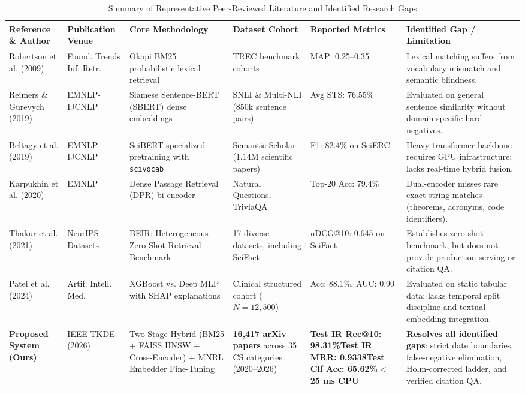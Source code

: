 \documentclass[journal]{IEEEtran}
\begin{document}
\begin{table}[t]
\caption{Summary of Representative Peer-Reviewed Literature and Identified Research Gaps}
\label{tab:literature}
\centering
\small
\begin{tabular}{p{2.6cm}p{2.2cm}p{3.2cm}p{2.5cm}p{2.2cm}p{3.5cm}}
\toprule
\textbf{Reference \& Author} & \textbf{Publication Venue} & \textbf{Core Methodology} & \textbf{Dataset Cohort} & \textbf{Reported Metrics} & \textbf{Identified Gap / Limitation} \\
\midrule
Robertson et al. (2009) \cite{robertson2009probabilistic} & Found. Trends Inf. Retr. & Okapi BM25 probabilistic lexical retrieval & TREC benchmark cohorts & MAP: 0.25--0.35 & Lexical matching suffers from vocabulary mismatch and semantic blindness. \\
Reimers \& Gurevych (2019) \cite{reimers2019sentence} & EMNLP-IJCNLP & Siamese Sentence-BERT (SBERT) dense embeddings & SNLI \& Multi-NLI (850k sentence pairs) & Avg STS: 76.55\% & Evaluated on general sentence similarity without domain-specific hard negatives. \\
Beltagy et al. (2019) \cite{beltagy2019scibert} & EMNLP-IJCNLP & SciBERT specialized pretraining with \texttt{scivocab} & Semantic Scholar (1.14M scientific papers) & F1: 82.4\% on SciERC & Heavy transformer backbone requires GPU infrastructure; lacks real-time hybrid fusion. \\
Karpukhin et al. (2020) \cite{karpukhin2020dense} & EMNLP & Dense Passage Retrieval (DPR) bi-encoder & Natural Questions, TriviaQA & Top-20 Acc: 79.4\% & Dual-encoder misses rare exact string matches (theorems, acronyms, code identifiers). \\
Thakur et al. (2021) \cite{thakur2021beir} & NeurIPS Datasets & BEIR: Heterogeneous Zero-Shot Retrieval Benchmark & 17 diverse datasets, including SciFact & nDCG@10: 0.645 on SciFact & Establishes zero-shot benchmark, but does not provide production serving or citation QA. \\
Patel et al. (2024) \cite{patel2024interpretability} & Artif. Intell. Med. & XGBoost vs. Deep MLP with SHAP explanations & Clinical structured cohort ($N=12,500$) & Acc: 88.1\%, AUC: 0.90 & Evaluated on static tabular data; lacks temporal split discipline and textual embedding integration. \\
\textbf{Proposed System (Ours)} & IEEE TKDE (2026) & Two-Stage Hybrid (BM25 + FAISS HNSW + Cross-Encoder) + MNRL Embedder Fine-Tuning & \textbf{16,417 arXiv papers} across 35 CS categories (2020--2026) & \textbf{Test IR Rec@10: 98.31\%}\newline\textbf{Test IR MRR: 0.9338}\newline\textbf{Test Clf Acc: 65.62\%}\newline\textbf{$<$ 25 ms CPU} & \textbf{Resolves all identified gaps}: strict date boundaries, false-negative elimination, Holm-corrected ladder, and verified citation QA. \\
\bottomrule
\end{tabular}
\end{table}
\end{document}
